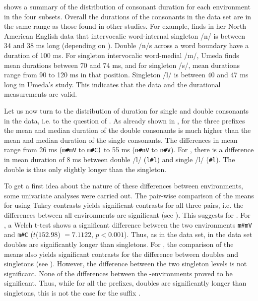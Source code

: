  shows a summary of the distribution of consonant duration for each environment in the four subsets. Overall the durations of the consonants in the data set are in the same range as those found in other studies. For example, \citet[Tables II and X]{Umeda.1977} finds in her North American English data that intervocalic word-internal singleton /n/ is between 34 and 38 ms long (depending on ). 
Double /n/s across a word boundary have a duration of 100 ms. For singleton intervocalic word-medial /m/, Umeda finds mean durations between 70 and 74 ms, and for singleton /s/, mean durations range from 90 to 120 ms in that position. Singleton /l/ is between 40 and 47 ms long in Umeda's study. This indicates that the data and the durational measurements are valid.

Let us now turn to the distribution of duration for single and double consonants in the data, i.e. to the question of .  As already shown in , for the three prefixes the mean and median duration of the double consonants is much higher than the mean and median duration of the single consonants. The differences in mean range from 26 ms (\texttt{m\#mV} to  \texttt{m\#C)} to 55 ms (\texttt{n\#nV} to  \texttt{n\#V}). For , there is a difference in mean duration of 8 ms between double /l/ (\texttt{l\#l}) and single /l/ (\texttt{\#l}). The double is thus only slightly longer than the singleton.
  
  



To get a first idea about the nature of these differences between environments, some univariate analyses were carried out. The pair-wise comparison of the means for  using Tukey contrasts yields significant contrasts for all three pairs, i.e. the differences between all environments are significant (see ). This suggests  for . 
For , a Welch t-test shows a significant difference between the two environments \texttt{m\#mV} and \texttt{m\#C} ($t$($152.98$) $=7.1122$, $p< 0.001$). 
Thus, as in the data set, in the data set doubles are significantly longer than singletons.
For , the comparison of the means also yields significant contrasts for the difference between doubles and singletons (see ). However, the difference between the two singleton levels is not significant. None of the differences between the -environments proved to be significant. Thus, while for all the prefixes, doubles are significantly longer than singletons, this is not the case for the suffix .


